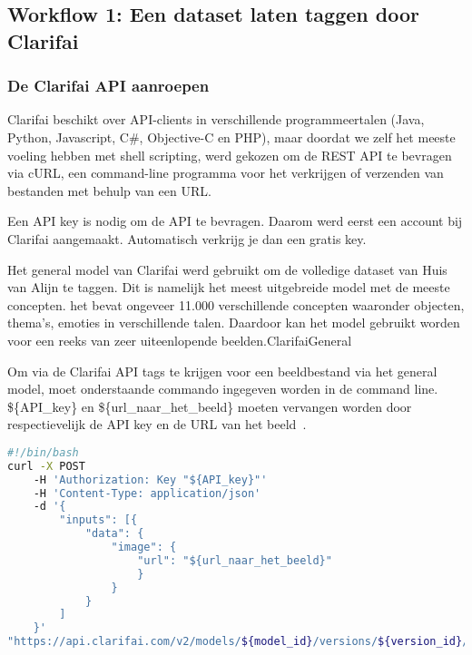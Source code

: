 \subsection{Workflow 1: Een dataset laten taggen door Clarifai}
\label{subsec:workflow1}

\subsubsection{De Clarifai API aanroepen}

Clarifai beschikt over API-clients in verschillende programmeertalen (Java, Python, Javascript, C\#, Objective-C en PHP), maar doordat we zelf het meeste voeling hebben met shell scripting, werd gekozen om de REST API te bevragen via cURL, een command-line programma voor het verkrijgen of verzenden van bestanden met behulp van  een URL.

Een API key is nodig om de API te bevragen. Daarom werd eerst een account bij Clarifai aangemaakt. Automatisch verkrijg je dan een gratis key. 


Het general model van Clarifai werd gebruikt om de volledige dataset van Huis van Alijn te taggen. Dit is namelijk het meest uitgebreide model met de meeste concepten. het bevat ongeveer 11.000 verschillende concepten waaronder objecten, thema's, emoties in verschillende talen. Daardoor kan het model gebruikt worden voor een reeks van zeer uiteenlopende beelden.{ClarifaiGeneral}

Om via de Clarifai API tags te krijgen voor een beeldbestand via het general model, moet onderstaande commando ingegeven worden in de command line. \$\{API\_key\} en \$\{url\_naar\_het\_beeld\} moeten vervangen worden door respectievelijk de API key en de URL van het beeld~\autocite{ClarifaiAPI}.


\begin{lstlisting}[language=bash,caption=bash commando om een beeld door Clarifai te laten taggen.]
#!/bin/bash
curl -X POST
    -H 'Authorization: Key "${API_key}"'
    -H 'Content-Type: application/json'
    -d '{
        "inputs": [{
            "data": {
                "image": { 
                    "url": "${url_naar_het_beeld}"
                    }
                }
            }
        ]
    }'
"https://api.clarifai.com/v2/models/${model_id}/versions/${version_id}/outputs"
\end{lstlisting}

